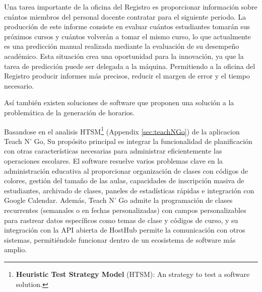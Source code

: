Una tarea importante de la oficina del Registro es proporcionar información sobre cuántos miembros del personal docente contratar para el siguiente periodo.
La producción de este informe consiste en evaluar cuántos estudiantes tomarán sus próximos cursos y cuántos volverán a tomar el mismo curso, lo que actualmente es una predicción manual realizada mediante la evaluación de su desempeño académico.
Esta situación crea una oportunidad para la innovación, ya que la tarea de predicción puede ser delegada a la máquina.
Permitiendo a la oficina del Registro producir informes más precisos, reducir el margen de error y el tiempo necesario.

Así también existen soluciones de software que proponen una solución a la problemática de la generación de horarios.

Basandose en el analisis HTSM\footnote{\textbf{Heuristic Test Strategy Model} (HTSM): An strategy to test a software solution.} (Appendix \ref{sec:teachNGo}) de la aplicacion Teach N' Go,
Su propósito principal es integrar la funcionalidad de planificación con otras características necesarias para administrar eficientemente las operaciones escolares.
El software resuelve varios problemas clave en la administración educativa al proporcionar organización de clases con códigos de colores, gestión del tamaño de las aulas, capacidades de inscripción masiva de estudiantes, archivado de clases, paneles de estadísticas rápidas e integración con Google Calendar.
Además, Teach N' Go admite la programación de clases recurrentes (semanales o en fechas personalizadas) con campos personalizables para rastrear datos específicos como temas de clase y códigos de curso, y su integración con la API abierta de HostHub permite la comunicación con otros sistemas, permitiéndole funcionar dentro de un ecosistema de software más amplio.
